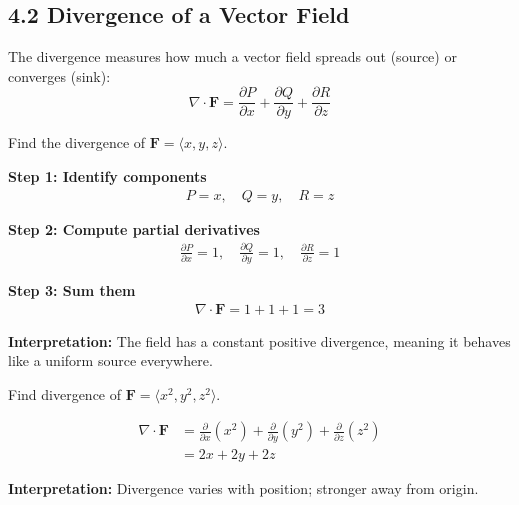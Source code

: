 \subsection*{4.2 Divergence of a Vector Field}

\begin{conceptbox}
    The divergence measures how much a vector field spreads out (source) or converges (sink):
    \begin{equation*}
        \nabla \cdot \mathbf{F} = \frac{\partial P}{\partial x} + \frac{\partial Q}{\partial y} + \frac{\partial R}{\partial z}
    \end{equation*}
\end{conceptbox}

\begin{examplebox}
    Find the divergence of $\mathbf{F}=\langle x,y,z\rangle$.

    \textbf{Step 1: Identify components}
    \begin{align*}
        P=x,\quad Q=y,\quad R=z
    \end{align*}

    \textbf{Step 2: Compute partial derivatives}
    \begin{align*}
        \frac{\partial P}{\partial x} = 1,\quad
        \frac{\partial Q}{\partial y} = 1,\quad
        \frac{\partial R}{\partial z} = 1
    \end{align*}

    \textbf{Step 3: Sum them}
    \begin{align*}
        \nabla \cdot \mathbf{F} = 1+1+1 = 3
    \end{align*}

    \textbf{Interpretation:} The field has a constant positive divergence, meaning it behaves like a uniform source everywhere.
\end{examplebox}

\begin{examplebox}
    Find divergence of $\mathbf{F}=\langle x^2, y^2, z^2 \rangle$.

    \begin{align*}
        \nabla \cdot \mathbf{F}
         & = \frac{\partial}{\partial x}(x^2) + \frac{\partial}{\partial y}(y^2) + \frac{\partial}{\partial z}(z^2) \\
         & = 2x + 2y + 2z
    \end{align*}

    \textbf{Interpretation:} Divergence varies with position; stronger away from origin.
\end{examplebox}
